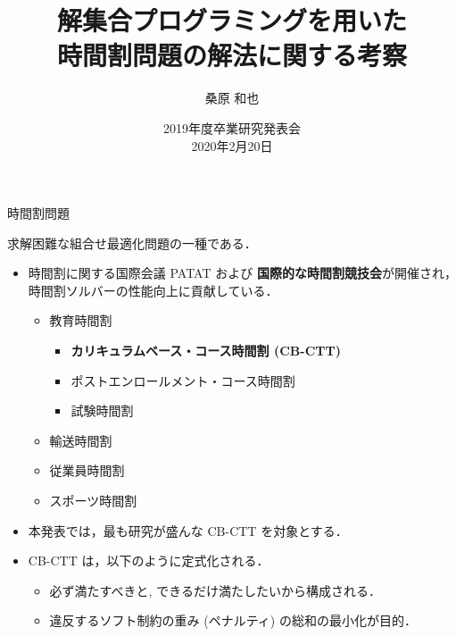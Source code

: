 \documentclass[11pt,dvipdfmx,handout]{beamer}
\title{解集合プログラミングを用いた\\時間割問題の解法に関する考察}
\author{桑原 和也}
\date{2019年度卒業研究発表会\\2020年2月20日}
\institute{番原研究室}
\begin{document}
\maketitle
\begin{frame}{時間割問題}
  \begin{block}{}\centering
    求解困難な組合せ最適化問題の一種である．
  \end{block}
  \begin{itemize}
  \item 時間割に関する国際会議 PATAT および
    \alert{\bf 国際的な時間割競技会}が開催され，
    時間割ソルバーの性能向上に貢献している．
    \begin{itemize}
    \item 教育時間割
      \begin{itemize}
      \item \alert{\bf カリキュラムベース・コース時間割 (CB-CTT)}
      \item ポストエンロールメント・コース時間割
      \item 試験時間割
      \end{itemize}
    \item 輸送時間割
    \item 従業員時間割
    \item スポーツ時間割
    \end{itemize}
  \item 本発表では，最も研究が盛んな CB-CTT を対象とする．
  \item CB-CTT は，以下のように定式化される．
    \begin{itemize}
    \item 必ず満たすべきと, 
    できるだけ満たしたいから構成される．
    \item 違反するソフト制約の重み (ペナルティ) の総和の最小化が目的．
    \end{itemize}
  \end{itemize}
\end{frame}
\end{document}
